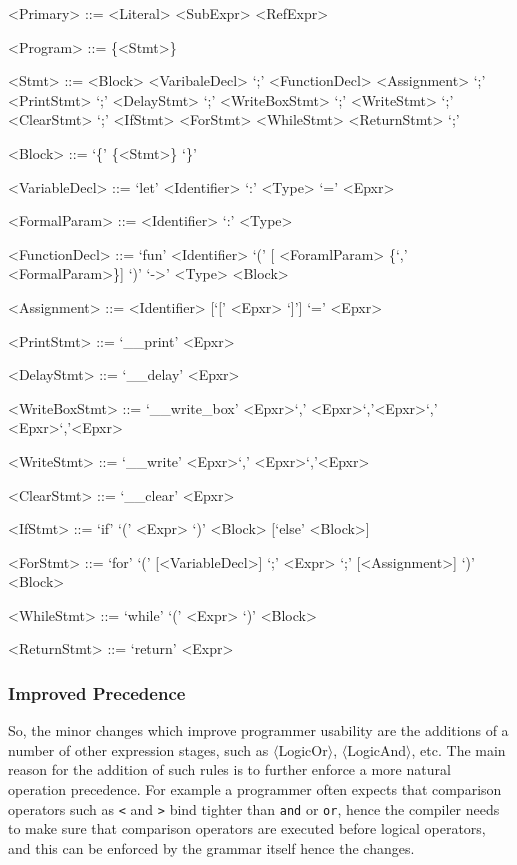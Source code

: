 \begin{center}
\begin{grammar}
<Primary> ::= <Literal>
\alt <SubExpr>
\alt <RefExpr>

<Program> ::= \{<Stmt>\}

<Stmt> ::= <Block>
\alt <VaribaleDecl> `;'
\alt <FunctionDecl>
\alt <Assignment> `;'
\alt <PrintStmt> `;'
\alt <DelayStmt> `;'
\alt <WriteBoxStmt> `;'
\alt <WriteStmt> `;'
\alt <ClearStmt> `;'
\alt <IfStmt>
\alt <ForStmt>
\alt <WhileStmt>
\alt <ReturnStmt> `;'

<Block> ::= `\{' \{<Stmt>\} `\}'

<VariableDecl> ::= `let' <Identifier> `:' <Type> `='
<Epxr>

<FormalParam> ::= <Identifier> `:' <Type>

<FunctionDecl> ::= `fun' <Identifier> `(' [ <ForamlParam>
\{`,' <FormalParam>\}] `)' `->' <Type> <Block>

<Assignment> ::= <Identifier> [`[' <Epxr> `]'] `='
<Epxr>

<PrintStmt> ::= `\_\_print' <Epxr>

<DelayStmt> ::= `\_\_delay' <Epxr>

<WriteBoxStmt> ::= `\_\_write\_box' <Epxr>`,'
<Epxr>`,'<Epxr>`,' <Epxr>`,'<Epxr>

<WriteStmt> ::= `\_\_write' <Epxr>`,' <Epxr>`,'<Epxr>

<ClearStmt> ::= `\_\_clear' <Epxr>

<IfStmt> ::= `if' `(' <Expr> `)' <Block> [`else' <Block>]

<ForStmt> ::= `for' `(' [<VariableDecl>] `;' <Expr> `;'
[<Assignment>] `)' <Block>

<WhileStmt> ::= `while' `(' <Expr> `)' <Block>

<ReturnStmt> ::= `return' <Expr>
\end{grammar}
\end{center}

\subsubsection{Improved Precedence}\label{sss:improvedprec}

So, the minor changes which improve programmer usability are the
additions of a number of other expression stages, such as
$\langle$LogicOr$\rangle$, $\langle$LogicAnd$\rangle$, etc. The
main reason for the addition of such rules is to further enforce
a more natural operation precedence. For example a programmer
often expects that comparison operators such as \texttt{<} and
\texttt{>} bind tighter than \texttt{and} or \texttt{or}, hence
the compiler needs to make sure that comparison operators are
executed before logical operators, and this can be enforced by
the grammar itself hence the changes.

